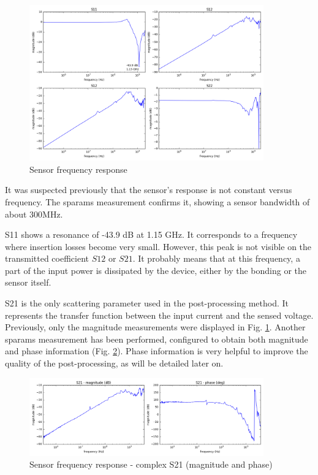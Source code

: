 \begin{figure}[!h]
  \centering
  \includegraphics[width=0.9\textwidth]{src/3/figures/sensor_freq_response.png}
  \caption{Sensor frequency response}
  \label{fig:sensor-response}
\end{figure}

It was suspected previously that the sensor's response is not constant versus frequency.
The \gls{sparams} measurement confirms it, showing a sensor bandwidth of about 300MHz.

S11 shows a resonance of -43.9 dB at 1.15 GHz.
It corresponds to a frequency where insertion losses become very small.
However, this peak is not visible on the transmitted coefficient $S12$ or $S21$.
It probably means that at this frequency, a part of the input power is dissipated by the device, either by the bonding or the sensor itself.

S21 is the only scattering parameter used in the post-processing method.
It represents the transfer function between the input current and the sensed voltage.
Previously, only the magnitude measurements were displayed in Fig. \ref{fig:sensor-response}.
Another \gls{sparams} measurement has been performed, configured to obtain both magnitude and phase information (Fig. \ref{fig:s21-response-complex}).
Phase information is very helpful to improve the quality of the post-processing, as will be detailed later on.

\begin{figure}[!h]
  \centering
  \includegraphics[width=0.9\textwidth]{src/3/figures/s21_freq_response.png}
  \caption{Sensor frequency response - complex S21 (magnitude and phase)}
  \label{fig:s21-response-complex}
\end{figure}

